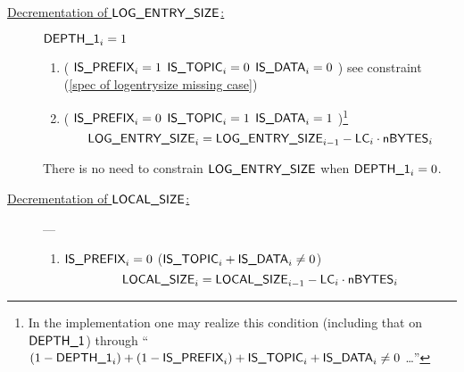 		\begin{description}
			\item[\underline{Decrementation of $\textsf{LOG\_ENTRY\_SIZE}$:}] \label{spec of logentrysize} \If $\textsf{DEPTH\_1}_{i}=1$ \Then
				\begin{enumerate}
					\item \If \Big(
						$\textsf{IS\_PREFIX}_{i} = 1$
						\et $\textsf{IS\_TOPIC}_{i} = 0$
						\et $\textsf{IS\_DATA}_{i} = 0$
						\Big) \Then see constraint (\ref{spec of logentrysize missing case})
					\item \If \Big(
						$\textsf{IS\_PREFIX}_{i} = 0$
						\Or $\textsf{IS\_TOPIC}_{i} = 1$
						\Or $\textsf{IS\_DATA}_{i} = 1$
						\Big)\footnote{In the implementation one may realize this condition (including that on $\textsf{DEPTH\_1}$) through
						``\If $(1 - \textsf{DEPTH\_1}_{i})
						+ (1 - \textsf{IS\_PREFIX}_{i})
						+ \textsf{IS\_TOPIC}_{i}
						+ \textsf{IS\_DATA}_{i} \neq 0$ \Then \dots{}''} \Then
						\[
							\textsf{LOG\_ENTRY\_SIZE}_{i} = \textsf{LOG\_ENTRY\_SIZE}_{i-1} - \textsf{LC}_{i} \cdot \textsf{nBYTES}_{i}
						\]
				\end{enumerate}
				\saNote{} There is no need to constrain $\textsf{LOG\_ENTRY\_SIZE}$ when $\textsf{DEPTH\_1}_{i}=0$.
			\item[\underline{Decrementation of $\textsf{LOCAL\_SIZE}$:}] ---
				\begin{enumerate}
					\item \If $\textsf{IS\_PREFIX}_{i}=0$ \et ($\textsf{IS\_TOPIC}_{i} + \textsf{IS\_DATA}_{i} \neq 0$) \Then
						\[ \textsf{LOCAL\_SIZE}_{i} = \textsf{LOCAL\_SIZE}_{i-1} - \textsf{LC}_{i} \cdot \textsf{nBYTES}_{i} \]
				\end{enumerate}
		\end{description}
